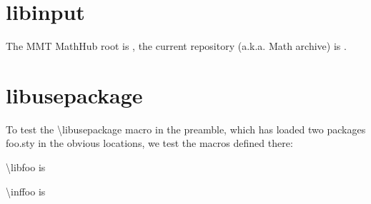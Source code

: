 \documentclass[minimal]{omdoc}
\begin{document}
\makeatletter

\section{libinput}
The MMT MathHub root is \textsf{\MathHub{}}, the current repository (a.k.a. Math
archive) is \textsf{\mh@currentrepos}.


\section{libusepackage}
To test the \textsf{\textbackslash libusepackage} macro in the preamble, which has loaded
two packages \textsf{foo.sty} in the obvious locations, we test the macros defined there:  

\textbackslash libfoo is \libfoo

\textbackslash inffoo is \inffoo
\end{document}
